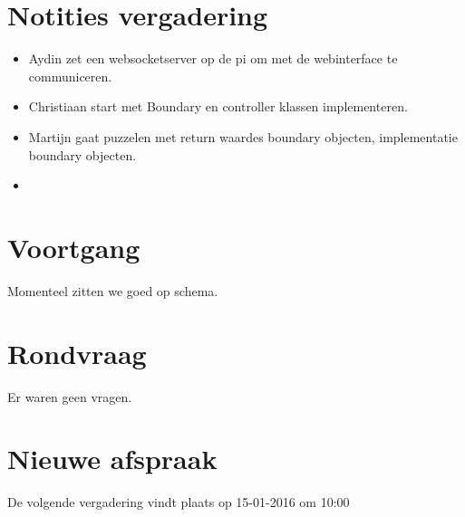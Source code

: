 \documentclass[dutch]{hu}
\begin{document}
\section{Notities vergadering}
\begin{itemize}

\item Aydin zet een websocketserver op de pi om met de webinterface te communiceren.
\item Christiaan start met Boundary en controller klassen implementeren.
\item Martijn gaat puzzelen met return waardes boundary objecten, implementatie boundary objecten.
\item  

\end{itemize}

\section{Voortgang}
Momenteel zitten we goed op schema.

\section{Rondvraag}
Er waren geen vragen.

\section{Nieuwe afspraak}
De volgende vergadering vindt plaats op 15-01-2016 om 10:00
\end{document}
